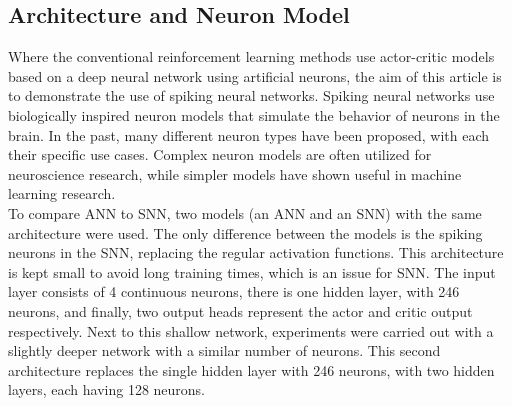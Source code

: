 \subsection{Architecture and Neuron Model}
Where the conventional reinforcement learning methods use actor-critic models based on a deep neural network using artificial neurons, the aim of this article is to demonstrate the use of spiking neural networks. Spiking neural networks use biologically inspired neuron models that simulate the behavior of neurons in the brain. In the past, many different neuron types have been proposed, with each their specific use cases. Complex neuron models are often utilized for neuroscience research, while simpler models have shown useful in machine learning research. \\

To compare ANN to SNN, two models (an ANN and an SNN) with the same architecture were used. The only difference between the models is the spiking neurons in the SNN, replacing the regular activation functions. This architecture is kept small to avoid long training times, which is an issue for SNN. The input layer consists of 4 continuous neurons, there is one hidden layer, with 246 neurons, and finally, two output heads represent the actor and critic output respectively. Next to this shallow network, experiments were carried out with a slightly deeper network with a similar number of neurons. This second architecture replaces the single hidden layer with 246 neurons, with two hidden layers, each having 128 neurons.\\

